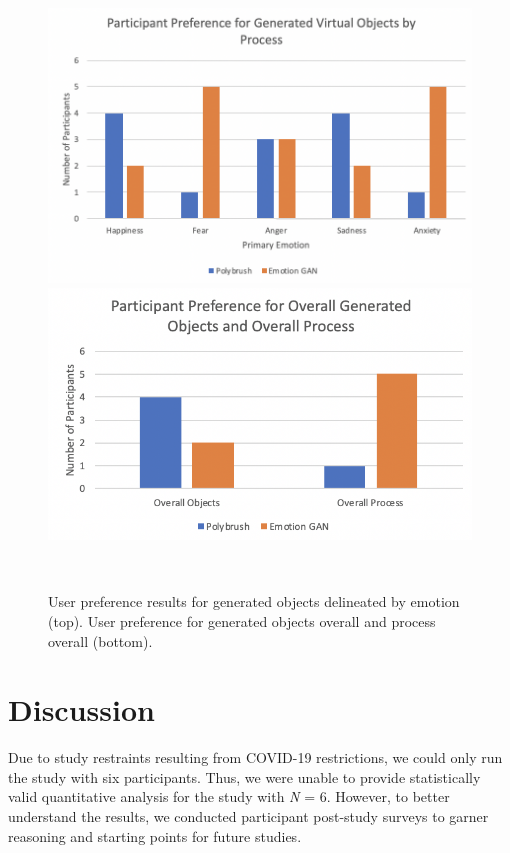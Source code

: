 \documentclass{sigchi}
\begin{document}
\begin{figure}
  \centering
  \includegraphics[width=2\columnwidth]{figures/emotiongraph}
  \includegraphics[width=2\columnwidth]{figures/overallgraph}
  \caption{User preference results for generated objects delineated by emotion (top). User preference for generated objects overall and process overall (bottom).}~\label{fig:figure5}
\end{figure}

\section{Discussion}
Due to study restraints resulting from COVID-19 restrictions, we could only run the study with six participants. Thus, we were unable to provide statistically valid quantitative analysis for the study with \emph N = 6. However, to better understand the results, we conducted participant post-study surveys to garner reasoning and starting points for future studies. 
\end{document}
